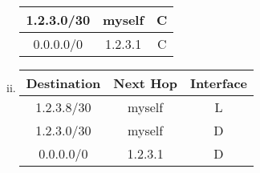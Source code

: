 \documentclass[12pt]{article}
\begin{document}
\begin{enumerate}
\begin{enumerate}
\begin{enumerate}[(i)]
\begin{tabular}{ |c|c|c| }
             1.2.3.0/30 & myself & C \\
             \hline
             0.0.0.0/0 & 1.2.3.1 & C \\
             \hline
            \end{tabular} 
        \item
            \begin{tabular}{ |c|c|c| } 
             \hline
             Destination & Next Hop & Interface \\ 
             \hline
             1.2.3.8/30 & myself & L \\
             \hline
             1.2.3.0/30 & myself & D \\
             \hline
             0.0.0.0/0 & 1.2.3.1 & D \\
             \hline
            \end{tabular} 
        \end{enumerate}
    \end{enumerate}
    

\end{enumerate}
\end{document}
